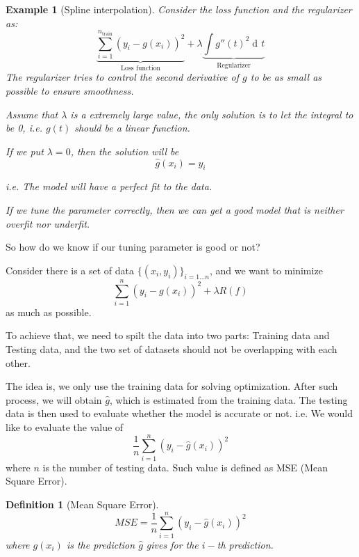 \documentclass{article}
\theoremstyle{MyNonumberplain}
\theoremstyle{break}
\newcommand{\der}{\operatorname{d\!}{}}
\theoremstyle{break}
\newtheorem{example}{Example}[section]
\newtheorem{definition}{Definition}[section]
\begin{document}
\begin{expbox}
    \begin{example}[Spline interpolation]
        Consider the loss function and the regularizer as: $$\underbrace{\sum_{i=1}^{n_{\text{train}}}(y_i-g(x_i))^2}_{\text{Loss function}}+\lambda\underbrace{\int g''(t)^2\der t}_{\text{Regularizer}}$$
        \medskip
        The regularizer tries to control the second derivative of $g$ to be as small as possible to ensure smoothness.
        
        Assume that $\lambda$ is a extremely large value, the only solution is to let the integral to be 0, i.e. $g(t)$ should 
        be a linear function.
        \medskip

        If we put $\lambda=0$, then the solution will be $$\hat{g}(x_i)=y_i$$

        i.e. The model will have a perfect fit to the data.
        \medskip

        If we tune the parameter correctly, then we can get a good model that is neither overfit nor underfit.
    \end{example}
\end{expbox}

So how do we know if our tuning parameter is good or not?

Consider there is a set of data $\{(x_i,y_i)\}_{i=1...n}$, and we want to minimize $$\sum_{i=1}^{n}(y_i-g(x_i))^2+\lambda R(f)$$ as much as possible.

To achieve that, we need to spilt the data into two parts: Training data and Testing data, and the two set of datasets
should not be overlapping with each other.

The idea is, we only use the training data for solving optimization. After such process, we will 
obtain $\hat{g}$, which is estimated from the training data. The testing data is then used to evaluate whether the model is accurate or not. i.e. We would like to 
evaluate the value of $$\frac{1}{n}\sum_{i=1}^{n}(y_i-\hat{g}(x_i))^2$$
where $n$ is the number of testing data. Such value is defined as MSE (Mean Square Error).

\begin{defbox}
    \begin{definition}[Mean Square Error]
        $$MSE=\frac{1}{n}\sum_{i=1}^{n}(y_i-\hat{g}(x_i))^2$$ where $g(x_i)$ is 
        the prediction $\hat{g}$ gives for the $i-$th prediction.
    \end{definition}
\end{defbox}
\end{document}
